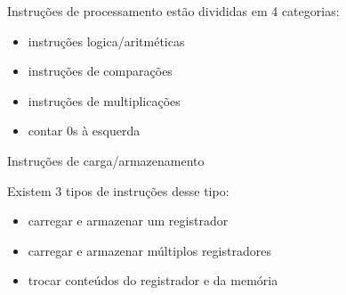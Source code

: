 Instruções de processamento estão divididas em 4 categorias:

\begin{itemize}
	\item instruções logica/aritméticas
	\item instruções de comparações
	\item instruções de multiplicações
	\item contar 0s à esquerda
\end{itemize}

Instruções de carga/armazenamento

Existem 3 tipos de instruções desse tipo:

\begin{itemize}
	\item carregar e armazenar um registrador
	\item carregar e armazenar múltiplos registradores
	\item trocar conteúdos do registrador e da memória
\end{itemize}
